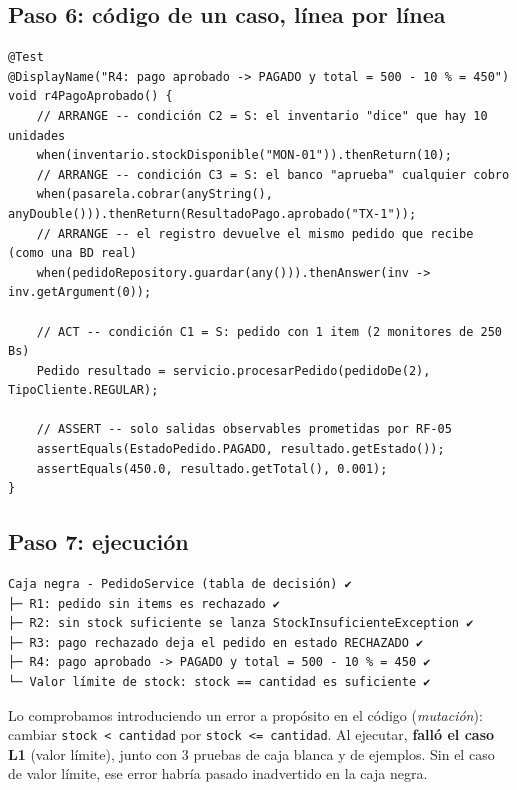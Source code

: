 \documentclass[11pt,a4paper,oneside]{report}
\newcommand{\code}[1]{\texttt{#1}}
\begin{document}
\subsection{Paso 6: código de un caso, línea por línea}
\begin{lstlisting}[caption={Regla R4 comentada paso a paso}]
@Test
@DisplayName("R4: pago aprobado -> PAGADO y total = 500 - 10 % = 450")
void r4PagoAprobado() {
    // ARRANGE -- condición C2 = S: el inventario "dice" que hay 10 unidades
    when(inventario.stockDisponible("MON-01")).thenReturn(10);
    // ARRANGE -- condición C3 = S: el banco "aprueba" cualquier cobro
    when(pasarela.cobrar(anyString(), anyDouble())).thenReturn(ResultadoPago.aprobado("TX-1"));
    // ARRANGE -- el registro devuelve el mismo pedido que recibe (como una BD real)
    when(pedidoRepository.guardar(any())).thenAnswer(inv -> inv.getArgument(0));

    // ACT -- condición C1 = S: pedido con 1 item (2 monitores de 250 Bs)
    Pedido resultado = servicio.procesarPedido(pedidoDe(2), TipoCliente.REGULAR);

    // ASSERT -- solo salidas observables prometidas por RF-05
    assertEquals(EstadoPedido.PAGADO, resultado.getEstado());
    assertEquals(450.0, resultado.getTotal(), 0.001);
}
\end{lstlisting}

\subsection{Paso 7: ejecución}
\begin{lstlisting}[style=bash,caption={Salida de la ejecución (ordenada)}]
Caja negra - PedidoService (tabla de decisión) ✔
├─ R1: pedido sin items es rechazado ✔
├─ R2: sin stock suficiente se lanza StockInsuficienteException ✔
├─ R3: pago rechazado deja el pedido en estado RECHAZADO ✔
├─ R4: pago aprobado -> PAGADO y total = 500 - 10 % = 450 ✔
└─ Valor límite de stock: stock == cantidad es suficiente ✔
\end{lstlisting}

\begin{nota}
Lo comprobamos introduciendo un error a propósito en el código (\emph{mutación}): cambiar \code{stock < cantidad} por \code{stock <= cantidad}. Al ejecutar, \textbf{falló el caso L1} (valor límite), junto con 3 pruebas de caja blanca y de ejemplos. Sin el caso de valor límite, ese error habría pasado inadvertido en la caja negra.
\end{nota}
\end{document}
